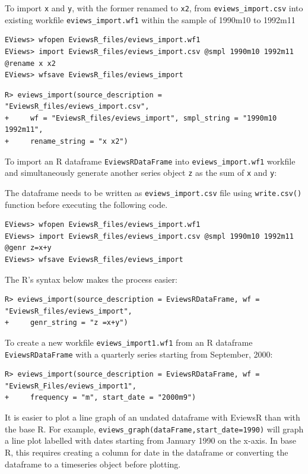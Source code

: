 To import \texttt{x} and \texttt{y}, with the former renamed to \texttt{x2}, from \texttt{eviews\_import.csv} into existing workfile \texttt{eviews\_import.wf1} within the sample of 1990m10 to 1992m11

\begin{verbatim}
EViews> wfopen EviewsR_files/eviews_import.wf1
EViews> import EviewsR_files/eviews_import.csv @smpl 1990m10 1992m11 @rename x x2
EViews> wfsave EviewsR_files/eviews_import
\end{verbatim}

\begin{verbatim}
R> eviews_import(source_description = "EviewsR_files/eviews_import.csv",
+     wf = "EviewsR_files/eviews_import", smpl_string = "1990m10 1992m11",
+     rename_string = "x x2")
\end{verbatim}

To import an R dataframe \texttt{EviewsRDataFrame} into \texttt{eviews\_import.wf1} workfile and simultaneously generate another series object \texttt{z} as the sum of \texttt{x} and \texttt{y}:

The dataframe needs to be written as \texttt{eviews\_import.csv} file using \texttt{write.csv()} function before executing the following code.

\begin{verbatim}
EViews> wfopen EviewsR_files/eviews_import.wf1
EViews> import EviewsR_files/eviews_import.csv @smpl 1990m10 1992m11 @genr z=x+y
EViews> wfsave EviewsR_files/eviews_import
\end{verbatim}

The R's syntax below makes the process easier:

\begin{verbatim}
R> eviews_import(source_description = EviewsRDataFrame, wf = "EviewsR_files/eviews_import",
+     genr_string = "z =x+y")
\end{verbatim}

To create a new workfile \texttt{eviews\_import1.wf1} from an R dataframe \texttt{EviewsRDataFrame} with a quarterly series starting from September, 2000:

\begin{verbatim}
R> eviews_import(source_description = EviewsRDataFrame, wf = "EviewsR_Files/eviews_import1",
+     frequency = "m", start_date = "2000m9")
\end{verbatim}

It is easier to plot a line graph of an undated dataframe with EviewsR than with the base R. For example, \texttt{eviews\_graph(dataFrame,start\_date=1990)} will graph a line plot labelled with dates starting from January 1990 on the x-axis. In base R, this requires creating a column for date in the dataframe or converting the dataframe to a timeseries object before plotting.\color{black}

